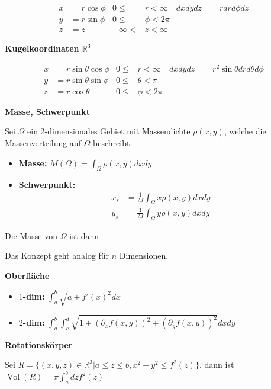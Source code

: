 \documentclass[25pt]{sciposter}
\newcommand{\R}{\mathbb{R}}
\newenvironment{method}[1]{\begin{mdframed}[backgroundcolor=blue!10,innertopmargin=15pt, innerbottommargin=15pt, nobreak=true]
		\textbf{#1 }
	}
	{ 
	\end{mdframed}
}
\begin{document}
\begin{multicols}{3}
\begin{align*}
x &= r\cos\phi  & 0 \leq &r < \infty & dxdydz &= r dr d\phi dz\\
y &= r\sin\phi  & 0 \leq &\phi < 2\pi & & \\
z &= z  &   -\infty < &z < \infty & & 
\end{align*}

\textbf{Kugelkoordinaten $\R^3$}

\begin{align*}
x &= r\sin\theta\cos\phi  & 0 \leq &r < \infty & dxdydz&=r^2 \sin \theta drd\theta d\phi\\
y &=r\sin\theta\sin\phi  & 0 \leq &\theta < \pi & & \\
z &= r\cos\theta  &  0 \leq &\phi < 2\pi & & 
\end{align*}



\begin{method}{Masse, Schwerpunkt}
	Sei $\Omega$ ein 2-dimensionales Gebiet mit Massendichte $\rho(x,y)$, welche die Massenverteilung auf $\Omega$ beschreibt.
	
	\begin{itemize}
		\item \textbf{Masse:} $M(\Omega) = \int_{\Omega} \rho(x,y) dx dy$
		\item \textbf{Schwerpunkt:} \begin{align*}x_s &= \frac{1}{M} \int_{\Omega} x\rho(x,y) dx dy \\ y_s &= \frac{1}{M} \int_{\Omega} y\rho(x,y) dx dy \end{align*}
	\end{itemize}
	 Die Masse von $\Omega$ ist dann
	 
	 Das Konzept geht analog für $n$ Dimensionen.
\end{method}



\begin{method}{Oberfläche}
	\begin{itemize}
		\item \textbf{$1$-dim:}  $\int_{a}^{b} \sqrt{a+f'(x)^2} dx$
		\item \textbf{$2$-dim:} $\int_{a}^{b} \int_{c}^{d} \sqrt{1 + (\partial_{x} f(x,y))^2 + (\partial_{y} f(x,y))^2} dx dy$
	\end{itemize}
\end{method}


\begin{method}{Rotationskörper}
	Sei $R = \{(x,y,z) \in \R^3 | a \leq z \leq b, x^2 + y^2 \leq f^2(z)  \}$, dann ist $\operatorname{Vol}(R) = \pi \int_{a}^{b} dz f^2(z)$
\end{method}



\end{multicols}
\end{document}
